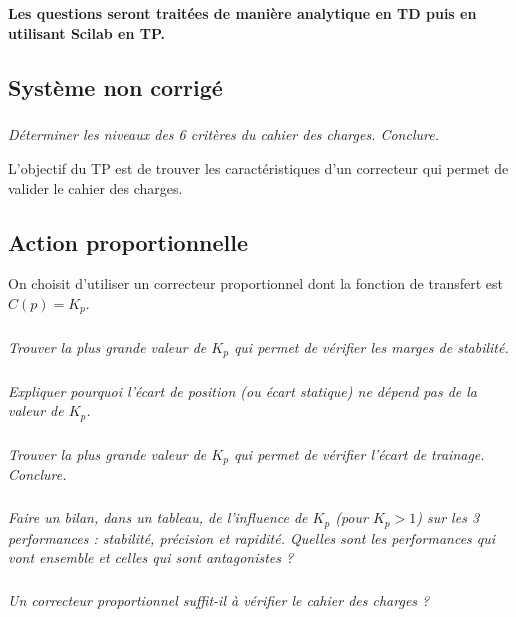 \documentclass[10pt,fleqn]{article} %
\begin{document}
\begin{multicols}{2}
\textbf{Les questions seront traitées de manière analytique en TD puis en utilisant Scilab en TP.}

\subsection*{Système non corrigé}

\subparagraph{}
\textit{Déterminer les niveaux des 6 critères du cahier des charges. Conclure.}
\ifprof
\begin{corrige}
\end{corrige}
\else
\fi

\begin{obj}
L’objectif du TP est de trouver les caractéristiques d’un correcteur qui permet de valider le cahier des charges.
\end{obj}

\subsection*{Action proportionnelle}


On choisit d’utiliser un correcteur proportionnel dont la fonction de transfert est $C(p)=K_p$.
\subparagraph{}
\textit{Trouver la plus grande valeur de $K_p$ qui permet de vérifier les marges de stabilité.}
\ifprof
\begin{corrige}
\end{corrige}
\else
\fi

\subparagraph{}
\textit{Expliquer pourquoi l’écart de position (ou écart statique) ne dépend pas de la valeur de $K_p$.}
\ifprof
\begin{corrige}
\end{corrige}
\else
\fi

\subparagraph{}
\textit{Trouver la plus grande valeur de $K_p$ qui permet de vérifier l'écart de trainage. Conclure.}
\ifprof
\begin{corrige}
\end{corrige}
\else
\fi

\subparagraph{}
\textit{Faire un bilan, dans un tableau, de l’influence de $K_p$ (pour $K_p>1$) sur les 3 performances : stabilité, précision et rapidité. Quelles sont les performances qui vont ensemble et celles qui sont antagonistes ?}
\ifprof
\begin{corrige}
\end{corrige}
\else
\fi

\subparagraph{}
\textit{Un correcteur proportionnel suffit-il à vérifier le cahier des charges ?}
\ifprof
\begin{corrige}
\end{corrige}
\else
\fi


\end{multicols}
\end{document}

